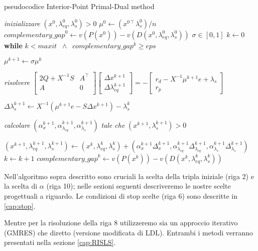 \begin{algorithm}
\caption{pseudocodice Interior-Point Primal-Dual method}\label{alg:pseudo}
\begin{algorithmic}[1]
\State \textit{inizializzare} $(x^0, \lambda_{eq}^0, \lambda_s^0) > 0$ 
\State $\mu^0 \gets (x^{0\intercal} \lambda_s^0)/n$
\State $\mathit{complementary\_gap}^0 \gets v(P(x^0)) - v(D(x^0,\lambda_{eq}^0,\lambda_s^0))$
\State $\sigma \in [0,1]$
\State $k \gets 0$
\BState \textbf{while} $k<maxit \;\; \land \;\; complementary\_gap^k \geq eps$

\State $\mu^{k+1} \gets \sigma \mu^{k}  $

\State \textit{risolvere} \;$
\begin{bmatrix}
2Q +X^{-1}S & A^\intercal\\
A & 0 \\
\end{bmatrix}\begin{bmatrix}\Delta x^{k+1} \\ \Delta \lambda_{eq}^{k+1}\end{bmatrix}= -
\begin{bmatrix}
    r_d-X^{-1}\mu^{k+1} e + \lambda_s\\r_p
\end{bmatrix}
$

\State $\Delta \lambda_s^{k+1} \gets X^{-1}(\mu^{k+1} e - S\Delta x^{k+1}) - \lambda_s^{k}$ 

\State \textit{calcolare} \; $(\alpha_x^{k+1}, \alpha_{\lambda_{eq}}^{k+1}, \alpha_{\lambda_{s}}^{k+1})$ 
\textit{tale che} $(x^{k+1},\lambda_{s}^{k+1})>0$


\State $(x^{k+1}, \lambda_{eq}^{k+1}, \lambda_{s}^{k+1}) \gets
(x^{k}, \lambda_{eq}^{k}, \lambda_{s}^{k}) + 
(\alpha_x^{k+1}\Delta_x^{k+1}, \alpha_{\lambda_{eq}}^{k+1}\Delta_{\lambda_{eq}}^{k+1}, \alpha_{\lambda_{s}}^{k+1}\Delta_{\lambda_{s}}^{k+1})$
\State $k \gets k + 1$
\State $\mathit{complementary\_gap}^k \gets v(P(x^k)) - v(D(x^k,\lambda_{eq}^k,\lambda_s^k))$
\EndFunction
\end{algorithmic}
\end{algorithm}

Nell'algoritmo sopra descritto sono cruciali la scelta della tripla iniziale (riga 2) e la scelta di $\alpha$ (riga 10); nelle sezioni seguenti descriveremo le nostre scelte progettuali a riguardo.
Le condizioni di stop scelte (riga 6) sono descritte in \ref{cap:stop}.

Mentre per la risoluzione della riga 8 utilizzeremo sia un approccio iterativo (GMRES) che diretto (versione modificata di LDL).
Entrambi i metodi verranno presentati nella sezione \ref{cap:RISLS}.

